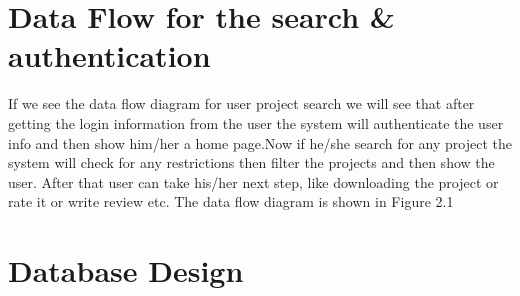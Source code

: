 \documentclass{scrreprt}
\begin{document}
\chapter{Data Flow for the search \& authentication}
If we  see the data flow diagram for user project search we will see that after getting the login information from the user the system will authenticate the user info and then show him/her a home page.Now if he/she search for any project the system will check for any restrictions then filter the projects and then show the user. After that user can take his/her next step, like downloading the project or rate it or write review etc. The data flow diagram is shown in Figure 2.1

\begin{center}
\end{center} 

\chapter{Database Design}
\end{document}

